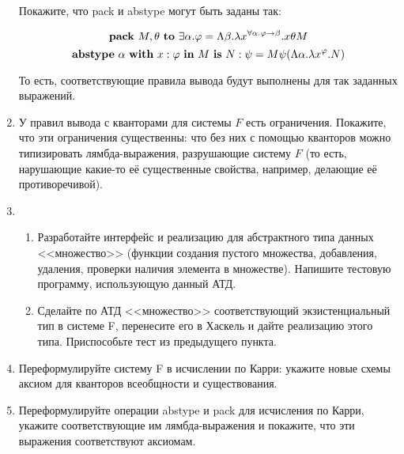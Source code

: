 \documentclass[10pt,a4paper,oneside]{article}
\begin{document}
\begin{enumerate}
Покажите, что pack и abstype могут быть заданы так:

	$$	\text{\textbf{pack} } M, \theta \text{ \textbf{to} } \exists \alpha . \varphi =
		\Lambda \beta . \lambda x^{\forall \alpha . \varphi \to \beta} . x \theta M $$
	$$	\text{\textbf{abstype} } \alpha \text{ \textbf{with} } x:\varphi \text{ \textbf{in} } M \text{ \textbf{is} } N:\psi =
		M \psi (\Lambda \alpha . \lambda x ^ \varphi . N)
	$$

То есть, соответствующие правила вывода будут выполнены для так заданных выражений.
\item У правил вывода с кванторами для системы $F$ есть ограничения. Покажите, что эти ограничения существенны: что без них 
с помощью кванторов можно типизировать лямбда-выражения, разрушающие систему $F$ (то есть, нарушающие какие-то её существенные
свойства, например, делающие её противоречивой).
\item \begin{enumerate}
\item Разработайте интерфейс и реализацию для абстрактного типа данных <<множество>> (функции создания пустого множества, 
добавления, удаления, проверки наличия элемента в множестве). Напишите тестовую программу, использующую данный АТД.
\item Сделайте по АТД <<множество>> соответствующий экзистенциальный тип в системе F, перенесите его в Хаскель и дайте
реализацию этого типа. Приспособьте тест из предыдущего пункта.
\end{enumerate}

\item Переформулируйте систему F в исчислении по Карри: укажите новые схемы аксиом для кванторов всеобщности и существования.
\item Переформулируйте операции abstype и pack для исчисления по Карри, укажите соответствующие им лямбда-выражения
и покажите, что эти выражения соответствуют аксиомам.
\end{enumerate}

\end{document}
